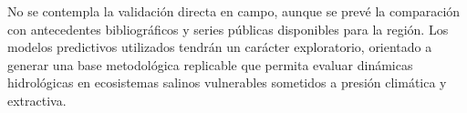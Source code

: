 No se contempla la validación directa en campo, aunque se prevé la comparación con antecedentes bibliográficos y series públicas disponibles para la región. Los modelos predictivos utilizados tendrán un carácter exploratorio, orientado a generar una base metodológica replicable que permita evaluar dinámicas hidrológicas en ecosistemas salinos vulnerables sometidos a presión climática y extractiva.


